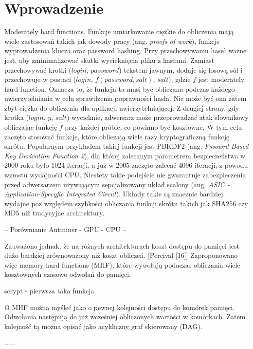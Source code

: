 \chapter{Wprowadzenie}
\thispagestyle{chapterBeginStyle}


Moderately hard functions. Funkcje umiarkowanie ciężkie do obliczenia mają wiele zastosowań takich jak dowody pracy (ang. \textit{proofs of work}), funkcje wyprowadzenia klucza oraz password hashing.
Przy przechowywaniu haseł ważne jest, aby zminimalizować skutki wycieknięcia pliku z hasłami.
Zamiast przechowywać krotki ($login$, $password$) tekstem jawnym, dodaje się losową sól i przechowuje w postaci ($login$, $f(password, salt)$, $salt$), gdzie $f$ jest moderately hard function.
Oznacza to, że funkcja ta musi być obliczana podczas każdego uwierzytelniania w celu sprawdzenia poprawności hasła. Nie może być ona zatem zbyt ciężka do obliczenia dla aplikacji uwierzytelniającej.
Z drugiej strony, gdy krotka ($login$, $y$, $salt$) wycieknie, adwersarz może przeprowadzać atak słownikowy obliczając funkcję $f$ przy każdej próbie, co powinno być kosztowne.
W tym celu zaczęto stosować funkcje, które obliczają wiele razy kryptograficzną funkcję skrótu. Popularnym przykładem takiej funkcji jest PBKDF2 (ang. \textit{Pssowrd-Based Key Derivation Function 2}), dla której zalecanym parametrem bezpieczeństwa w 2000 roku było 1024 iteracji, a już w 2005 zaczęto zalecać 4096 iteracji, z powodu wzrostu wydajności CPU.
Niestety takie podejście nie gwarantuje zabezpieczenia przed adwersarzem używającym sepcjalizowany układ scalony (ang. \textit{ASIC - Application-Specyfic Integrated Circut}).
Układy takie są znacznie bardziej wydajne poz względem szybkości obliczania funkcji skrótu takich jak SHA256 czy MD5 niż tradycyjne architektury.

-- Porównianie Antminer - GPU - CPU --

Zauważono jednak, że na różnych architekturach koszt dostępu do pamięci jest dużo bardziej zrównoważony niż koszt obliczeń. [Percival [16]]
Zaproponowano więc memory-hard functions (MHF), które wywołują podaczas obliczania wiele kosztownych czasowo odwołań do pamięci.

scrypt - pierwsza taka funkcja

O MHF można myśleć jako o pewnej kolejności dostępu do komórek pamięci. Odwołania następują do już wcześniej obliczonych wartości w komórkach.
Zatem kolejność tą można opisać jako acykliczny graf skierowany (DAG).

......


